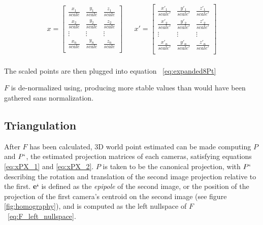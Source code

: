 \documentclass[Conference]{IEEEtran}
\begin{document}
\begin{align}\label{eq:pointsScaled}
    x = \begin{bmatrix}
        \frac{x_1}{scale} & \frac{y_1}{scale} & \frac{z_1}{scale}\\[0.3em]
        \frac{x_2}{scale} & \frac{y_2}{scale} & \frac{z_2}{scale}\\[0.3em]
        \vdots & \vdots & \vdots\\ 
        \frac{x_n}{scale} & \frac{y_n}{scale} & \frac{z_n}{scale}\\[0.3em]
    \end{bmatrix}
&&
    x' =
    \begin{bmatrix}
        \frac{x'_1}{scale'} & \frac{y'_1}{scale'} & \frac{z'_1}{scale'}\\[0.3em] 
        \frac{x'_2}{scale'} & \frac{y'_2}{scale'} & \frac{z'_2}{scale'}\\[0.3em]
        \vdots & \vdots & \vdots\\ 
        \frac{x'_n}{scale'} & \frac{y'_n}{scale'} & \frac{z'_n}{scale'}\\[0.3em]
    \end{bmatrix}
\end{align}
\\
The scaled points are then plugged into equation ~\eqref{eq:expanded8Pt}


$F$ is de-normalized using, producing more stable values than would have been gathered sans normalization.



\subsection{Triangulation}
After $F$ has been calculated, 3D world point estimated can be made computing $P$ and $P`$, the estimated projection matrices of each cameras, satisfying equations \eqref{eq:xPX_1} and \eqref{eq:xPX_2}. $P$ is taken to be the canonical projection, with $P`$ describing the rotation and translation of the second image projection relative to the first. \textbf{e`} is defined as the \textit{epipole} of the second image, or the position of the projection of the first camera's centroid on the second image (see figure \ref{fig:homography}), and is computed as the left nullspace of $F$~\eqref{eq:F_left_nullspace}.

\begin{equation}\label{eq:xPX_1}\end{equation}
\begin{equation}\label{eq:xPX_2}\end{equation}
\begin{equation}\label{eq:P}\end{equation}
\begin{equation}\label{eq:P_prime}\end{equation}
\begin{equation}\label{eq:F_left_nullspace}\end{equation}
\end{document}

